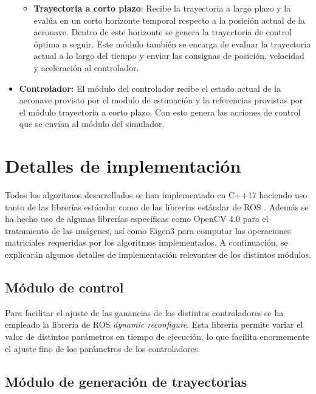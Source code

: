 \begin{itemize}
\begin{itemize}
		\item \textbf{Trayectoria a corto plazo}: Recibe la trayectoria a largo plazo y la evalúa en un corto horizonte temporal respecto a la posición actual de la aeronave. Dentro de este horizonte se genera la trayectoria de control óptima a seguir. Este módulo también se encarga de evaluar la trayectoria actual a lo largo del tiempo y enviar las consignas de posición, velocidad y aceleración al controlador.
	\end{itemize}
	
	\item \textbf{Controlador:} El módulo del controlador recibe el estado actual de la aeronave provisto por el modulo de estimación y la referencias provistas por el módulo trayectoria a corto plazo. Con esto genera las acciones de control que se envían al módulo del simulador.
	
\end{itemize}


\section{Detalles de implementación}

Todos los algoritmos desarrollados se han implementado en C++17 haciendo uso tanto de las librerías estándar como de las librerías estándar de ROS . Además se ha hecho uso de algunas librerías específicas como OpenCV 4.0 para el tratamiento de las imágenes, así como Eigen3 para computar las operaciones matriciales requeridas por los algoritmos implementados. A continuación, se explicarán algunos detalles de implementación relevantes de los distintos módulos.

\subsection{Módulo de control}

Para facilitar el ajuste de las ganancias de los distintos controladores se ha empleado la librería de ROS \textit{dynamic reconfigure}. Esta librería permite variar el valor de distintos parámetros en tiempo de ejecución, lo que facilita enormemente el ajuste fino de los parámetros de los controladores. 
\newpage
\subsection{Módulo de generación de trayectorias}

